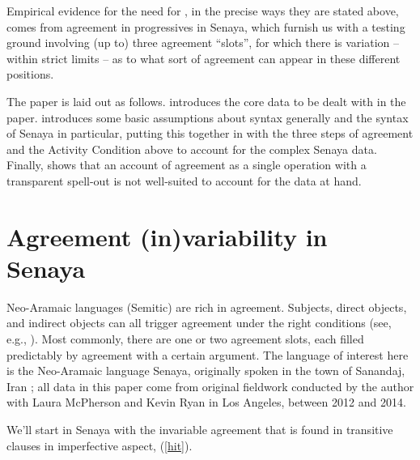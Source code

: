 \documentclass[output=paper
,modfonts
,nonflat]{langsci/langscibook}
\begin{document}
\noindent Empirical evidence for the need for , in the precise ways they are stated above, comes from agreement in progressives in Senaya, which furnish us with a testing ground involving (up to) three agreement ``slots'', for which there is variation -- within strict limits -- as to what sort of agreement can appear in these different positions.

The paper is laid out as follows.  introduces the core data to be dealt with in the paper.  introduces some basic assumptions about syntax generally and the syntax of Senaya in particular, putting this together in  with the three steps of agreement and the Activity Condition above to account for the complex Senaya data. Finally,  shows that an account of agreement as a single operation with a transparent spell-out is not well-suited to account for the data at hand.

\section{Agreement (in)variability in Senaya} \label{sec-kalin:2}

Neo-Aramaic languages (Semitic) are rich in agreement. Subjects, direct objects, and indirect objects can all trigger agreement under the right conditions (see, e.g., \citealt{DoronKhan12,KalinvanUrk15}). Most commonly, there are one or two agreement slots, each filled predictably by agreement with a certain argument. The language of interest here is the Neo-Aramaic language Senaya, originally spoken in the town of Sanandaj, Iran \citep{Panoussi90}; all data in this paper come from original fieldwork conducted by the author with Laura McPherson and Kevin Ryan in Los Angeles, between 2012 and 2014.

We'll start in Senaya with the invariable agreement that is found in transitive clauses in imperfective aspect, (\ref{hit}).

\eal \label{hit}
\zl{}
\end{document}
